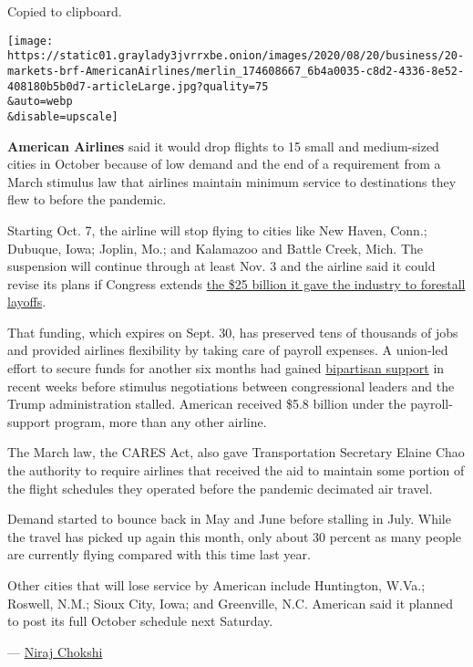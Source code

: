 Copied to clipboard.

\texttt{[image: https://static01.graylady3jvrrxbe.onion/images/2020/08/20/business/20-markets-brf-AmericanAirlines/merlin\_174608667\_6b4a0035-c8d2-4336-8e52-408180b5b0d7-articleLarge.jpg?quality=75\\\&auto=webp\\\&disable=upscale]}

\textbf{American Airlines} said it would drop flights to 15 small and
medium-sized cities in October because of low demand and the end of a
requirement from a March stimulus law that airlines maintain minimum
service to destinations they flew to before the pandemic.

Starting Oct. 7, the airline will stop flying to cities like New Haven,
Conn.; Dubuque, Iowa; Joplin, Mo.; and Kalamazoo and Battle Creek, Mich.
The suspension will continue through at least Nov. 3 and the airline
said it could revise its plans if Congress extends
\href{https://www.nytimes3xbfgragh.onion/2020/04/14/business/coronavirus-airlines-bailout-treasury-department.html}{the
\$25 billion it gave the industry to forestall layoffs}.

That funding, which expires on Sept. 30, has preserved tens of thousands
of jobs and provided airlines flexibility by taking care of payroll
expenses. A union-led effort to secure funds for another six months had
gained
\href{https://www.nytimes3xbfgragh.onion/live/2020/08/05/business/stock-market-today-coronavirus/republican-senators-back-an-extension-of-support-for-airlines}{bipartisan
support} in recent weeks before stimulus negotiations between
congressional leaders and the Trump administration stalled. American
received \$5.8 billion under the payroll-support program, more than any
other airline.

The March law, the CARES Act, also gave Transportation Secretary Elaine
Chao the authority to require airlines that received the aid to maintain
some portion of the flight schedules they operated before the pandemic
decimated air travel.

Demand started to bounce back in May and June before stalling in July.
While the travel has picked up again this month, only about 30 percent
as many people are currently flying compared with this time last year.

Other cities that will lose service by American include Huntington,
W.Va.; Roswell, N.M.; Sioux City, Iowa; and Greenville, N.C. American
said it planned to post its full October schedule next Saturday.

--- \href{https://www.nytimes3xbfgragh.onion/by/niraj-chokshi}{Niraj
Chokshi}

